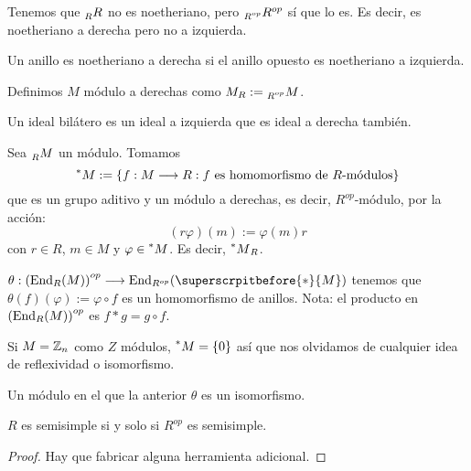 Tenemos que \(\prescript{}{R}{R}\) no es noetheriano, pero
\(\prescript{}{R^{op}}{R^{op}}\) sí que lo es.
Es decir, es noetheriano a derecha pero no a izquierda.

\begin{df}
  Un anillo es noetheriano a derecha si el anillo opuesto es noetheriano
  a izquierda.
\end{df}
\begin{df}
  Definimos \(M\) módulo a derechas como \(M_R:=\prescript{}{R^{op}}{M}\).
\end{df}

\begin{df}
  Un ideal bilátero es un ideal a izquierda que es ideal a derecha también.
\end{df}

\begin{df}
  Sea \(\prescript{}{R}{M}\) un módulo. Tomamos
  \[
    \prescript{*}{}{M}:=\{f:M\longrightarrow R: f
    \textrm{ es homomorfismo de \(R\)-módulos}\}
  \]
  que es un grupo aditivo y un módulo a derechas, es decir,
  \(R^{op}\)-módulo, por la acción:
  \[
    (r\varphi)(m):=\varphi(m)r
  \]
  con \(r\in R\), \(m\in M\) y \(\varphi\in \prescript{*}{}{M}\).
  Es decir, \(\prescript{*}{}{M}_R\).
\end{df}

\begin{lema}
  \(\theta:{(\End_R(M))}^{op}
  \longrightarrow\End_{R^{op}}(\superscrpitbefore{*}{M})\)
  tenemos que \(\theta(f)(\varphi):=\varphi\circ f\) es un homomorfismo
  de anillos.
  Nota: el producto en \({(\operatorname{End}_R(M))}^{op}\) es \(f*g=g\circ f\).
\end{lema}

Si \(M=\mathbb{Z}_n\) como \(Z\) módulos, \(\prescript{*}{}{M}=\{0\}\) así que
nos olvidamos de cualquier idea de reflexividad o isomorfismo.

\begin{df}
  Un módulo en el que la anterior \(\theta\) es un isomorfismo.
\end{df}

\begin{teo}
  \(R\) es semisimple si y solo si \(R^{op}\) es semisimple.
\end{teo}
\begin{proof}
  Hay que fabricar alguna herramienta adicional.

\end{proof}


